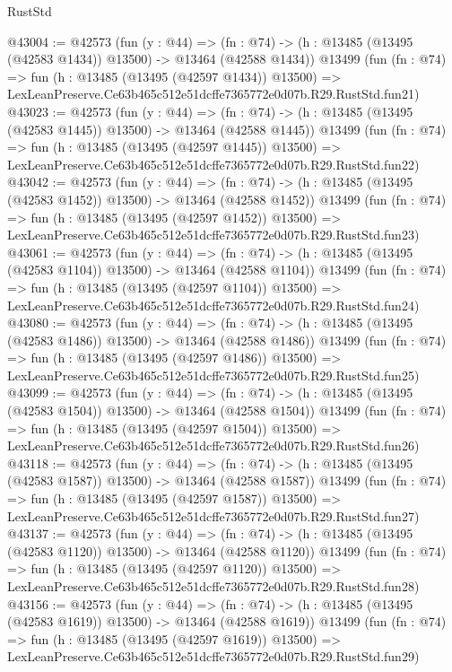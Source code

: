 \begin{lexlean}{RustStd}
\begin{coremodule}
@43004 := @42573
    (fun (y : @44) =>
    (fn : @74) -> (h : @13485 (@13495 (@42583 @1434)) @13500) -> @13464 (@42588 @1434))
    @13499
    (fun (fn : @74) =>
    fun (h : @13485 (@13495 (@42597 @1434)) @13500) =>
    LexLeanPreserve.Ce63b465c512e51dcffe7365772e0d07b.R29.RustStd.fun21)
@43023 := @42573
    (fun (y : @44) =>
    (fn : @74) -> (h : @13485 (@13495 (@42583 @1445)) @13500) -> @13464 (@42588 @1445))
    @13499
    (fun (fn : @74) =>
    fun (h : @13485 (@13495 (@42597 @1445)) @13500) =>
    LexLeanPreserve.Ce63b465c512e51dcffe7365772e0d07b.R29.RustStd.fun22)
@43042 := @42573
    (fun (y : @44) =>
    (fn : @74) -> (h : @13485 (@13495 (@42583 @1452)) @13500) -> @13464 (@42588 @1452))
    @13499
    (fun (fn : @74) =>
    fun (h : @13485 (@13495 (@42597 @1452)) @13500) =>
    LexLeanPreserve.Ce63b465c512e51dcffe7365772e0d07b.R29.RustStd.fun23)
@43061 := @42573
    (fun (y : @44) =>
    (fn : @74) -> (h : @13485 (@13495 (@42583 @1104)) @13500) -> @13464 (@42588 @1104))
    @13499
    (fun (fn : @74) =>
    fun (h : @13485 (@13495 (@42597 @1104)) @13500) =>
    LexLeanPreserve.Ce63b465c512e51dcffe7365772e0d07b.R29.RustStd.fun24)
@43080 := @42573
    (fun (y : @44) =>
    (fn : @74) -> (h : @13485 (@13495 (@42583 @1486)) @13500) -> @13464 (@42588 @1486))
    @13499
    (fun (fn : @74) =>
    fun (h : @13485 (@13495 (@42597 @1486)) @13500) =>
    LexLeanPreserve.Ce63b465c512e51dcffe7365772e0d07b.R29.RustStd.fun25)
@43099 := @42573
    (fun (y : @44) =>
    (fn : @74) -> (h : @13485 (@13495 (@42583 @1504)) @13500) -> @13464 (@42588 @1504))
    @13499
    (fun (fn : @74) =>
    fun (h : @13485 (@13495 (@42597 @1504)) @13500) =>
    LexLeanPreserve.Ce63b465c512e51dcffe7365772e0d07b.R29.RustStd.fun26)
@43118 := @42573
    (fun (y : @44) =>
    (fn : @74) -> (h : @13485 (@13495 (@42583 @1587)) @13500) -> @13464 (@42588 @1587))
    @13499
    (fun (fn : @74) =>
    fun (h : @13485 (@13495 (@42597 @1587)) @13500) =>
    LexLeanPreserve.Ce63b465c512e51dcffe7365772e0d07b.R29.RustStd.fun27)
@43137 := @42573
    (fun (y : @44) =>
    (fn : @74) -> (h : @13485 (@13495 (@42583 @1120)) @13500) -> @13464 (@42588 @1120))
    @13499
    (fun (fn : @74) =>
    fun (h : @13485 (@13495 (@42597 @1120)) @13500) =>
    LexLeanPreserve.Ce63b465c512e51dcffe7365772e0d07b.R29.RustStd.fun28)
@43156 := @42573
    (fun (y : @44) =>
    (fn : @74) -> (h : @13485 (@13495 (@42583 @1619)) @13500) -> @13464 (@42588 @1619))
    @13499
    (fun (fn : @74) =>
    fun (h : @13485 (@13495 (@42597 @1619)) @13500) =>
    LexLeanPreserve.Ce63b465c512e51dcffe7365772e0d07b.R29.RustStd.fun29)

\end{coremodule}
\end{lexlean}
